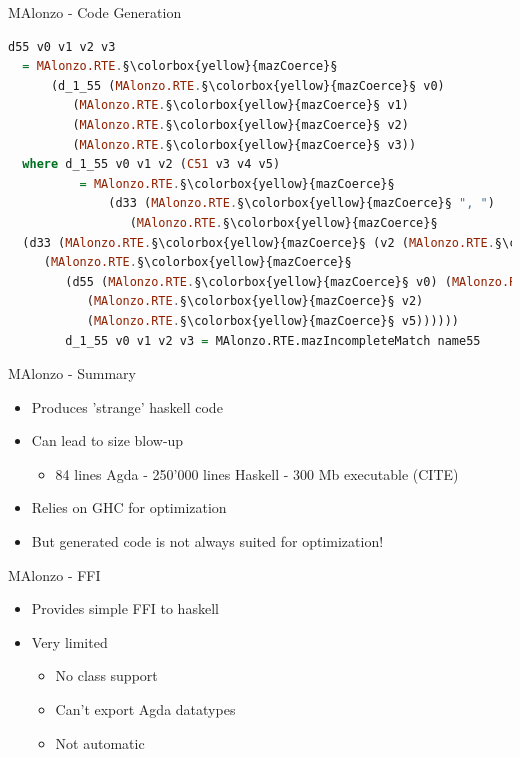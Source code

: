 \begin{frame}[fragile]{MAlonzo - Code Generation}
\begin{lstlisting}[language=Haskell,basicstyle=\scriptsize]
d55 v0 v1 v2 v3
  = MAlonzo.RTE.§\colorbox{yellow}{mazCoerce}§
      (d_1_55 (MAlonzo.RTE.§\colorbox{yellow}{mazCoerce}§ v0)
         (MAlonzo.RTE.§\colorbox{yellow}{mazCoerce}§ v1)
         (MAlonzo.RTE.§\colorbox{yellow}{mazCoerce}§ v2)
         (MAlonzo.RTE.§\colorbox{yellow}{mazCoerce}§ v3))
  where d_1_55 v0 v1 v2 (C51 v3 v4 v5)
          = MAlonzo.RTE.§\colorbox{yellow}{mazCoerce}§
              (d33 (MAlonzo.RTE.§\colorbox{yellow}{mazCoerce}§ ", ")
                 (MAlonzo.RTE.§\colorbox{yellow}{mazCoerce}§
  (d33 (MAlonzo.RTE.§\colorbox{yellow}{mazCoerce}§ (v2 (MAlonzo.RTE.§\colorbox{yellow}{mazCoerce}§ v4)))
     (MAlonzo.RTE.§\colorbox{yellow}{mazCoerce}§
        (d55 (MAlonzo.RTE.§\colorbox{yellow}{mazCoerce}§ v0) (MAlonzo.RTE.§\colorbox{yellow}{mazCoerce}§ v3)
           (MAlonzo.RTE.§\colorbox{yellow}{mazCoerce}§ v2)
           (MAlonzo.RTE.§\colorbox{yellow}{mazCoerce}§ v5))))))
        d_1_55 v0 v1 v2 v3 = MAlonzo.RTE.mazIncompleteMatch name55
\end{lstlisting}
\end{frame}

\begin{frame}{MAlonzo - Summary}
\begin{itemize}
  \item Produces 'strange' haskell code
  \item Can lead to size blow-up
  \begin {itemize}
    \item 84 lines Agda - 250'000 lines Haskell - 300 Mb executable (CITE)
  \end{itemize}
  \item Relies on GHC for optimization
  \item But generated code is not always suited for optimization!
\end{itemize}
\end{frame}


\begin{frame}{MAlonzo - FFI}
\begin{itemize}
\item Provides simple FFI to haskell
\item Very limited
  \begin{itemize}
    \item No class support
    \item Can't export Agda datatypes
    \item Not automatic
  \end{itemize}
\end{itemize}
\end{frame}

